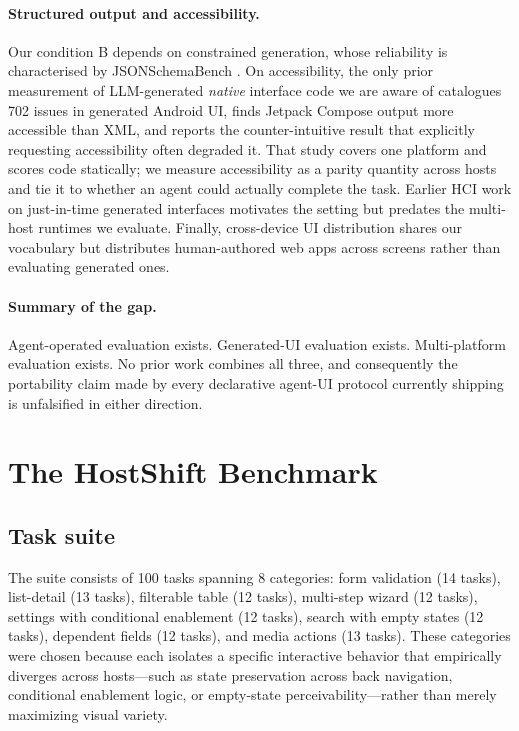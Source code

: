\documentclass{article}
\begin{document}
\paragraph{Structured output and accessibility.}
Our condition B depends on constrained generation, whose reliability is
characterised by JSONSchemaBench \cite{jsonschemabench2025}. On accessibility,
the only prior measurement of LLM-generated \emph{native} interface code we are
aware of \cite{androida11y2026} catalogues 702 issues in generated Android UI,
finds Jetpack Compose output more accessible than XML, and reports the
counter-intuitive result that explicitly requesting accessibility often degraded
it. That study covers one platform and scores code statically; we measure
accessibility as a parity quantity across hosts and tie it to whether an agent
could actually complete the task. Earlier HCI work on just-in-time generated
interfaces \cite{dynavis2024,bespoke2024} motivates the setting but predates the
multi-host runtimes we evaluate. Finally, cross-device UI distribution
\cite{vulture2024} shares our vocabulary but distributes human-authored web apps
across screens rather than evaluating generated ones.

\paragraph{Summary of the gap.}
Agent-operated evaluation exists. Generated-UI evaluation exists. Multi-platform
evaluation exists. No prior work combines all three, and consequently the
portability claim made by every declarative agent-UI protocol currently shipping
is unfalsified in either direction.

\section{The HostShift Benchmark}
\subsection{Task suite}
The suite consists of 100 tasks spanning 8 categories: form validation (14 tasks), list-detail (13 tasks), filterable table (12 tasks), multi-step wizard (12 tasks), settings with conditional enablement (12 tasks), search with empty states (12 tasks), dependent fields (12 tasks), and media actions (13 tasks). These categories were chosen because each isolates a specific interactive behavior that empirically diverges across hosts---such as state preservation across back navigation, conditional enablement logic, or empty-state perceivability---rather than merely maximizing visual variety.
\end{document}
